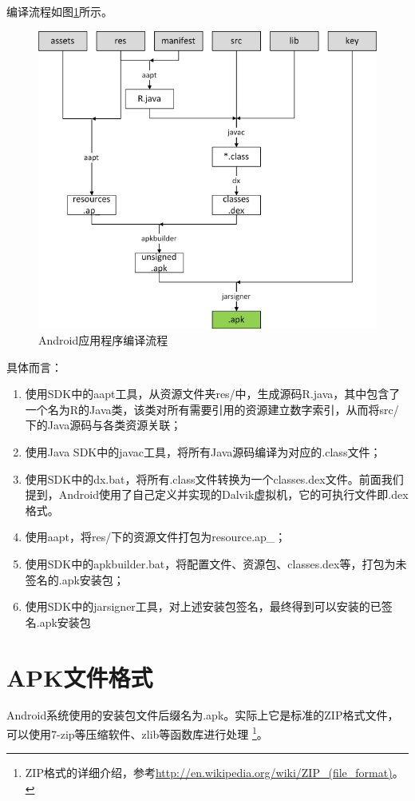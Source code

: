 编译流程如图\ref{Fig:compilation}所示。
\begin{figure}[htb]
	\centering
	\includegraphics[width=14cm]{image/compilation.jpg}
 	 \caption{Android应用程序编译流程}
	 \label{Fig:compilation}
\end{figure}
具体而言：
\begin{enumerate}
	\item 使用SDK中的aapt工具，从资源文件夹res/中，生成源码R.java，其中包含了一个名为R的Java类，该类对所有需要引用的资源建立数字索引，从而将src/下的Java源码与各类资源关联；
	\item 使用Java SDK中的javac工具，将所有Java源码编译为对应的.class文件；
	\item 使用SDK中的dx.bat，将所有.class文件转换为一个classes.dex文件。前面我们提到，Android使用了自己定义并实现的Dalvik虚拟机，它的可执行文件即.dex格式。
	\item 使用aapt，将res/下的资源文件打包为resource.ap\_；
	\item 使用SDK中的apkbuilder.bat，将配置文件、资源包、classes.dex等，打包为未签名的.apk安装包；
	\item 使用SDK中的jarsigner工具，对上述安装包签名，最终得到可以安装的已签名.apk安装包
\end{enumerate}

\section{APK文件格式}
Android系统使用的安装包文件后缀名为.apk。实际上它是标准的ZIP格式文件，可以使用7-zip等压缩软件、zlib等函数库进行处理
\footnote{ZIP格式的详细介绍，参考\url{http://en.wikipedia.org/wiki/ZIP\_(file\_format)}。}。

